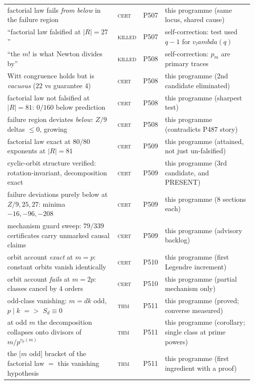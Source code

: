 \documentclass[12pt,a4paper]{article}
\def\mathbb#1{#1}%
\def\textbf#1{#1}%
\def\lambda{lambda}%
\def\Rightarrow{ => }%
\theoremstyle{definition}
\newcommand{\ZZ}{\mathbb{Z}}
\begin{document}
\begin{center}
\begin{tabular}{@{}p{}llp{}@{}}
factorial law fails \emph{from below} in the failure region & \textsc{cert} & P507 & this programme (same locus, shared cause) \\
``factorial law falsified at $|R|{=}27$'' & \textsc{killed} & P507 & self-correction: test used $q{-}1$ for $v_\lambda(q)$ \\
``the $m!$ is what Newton divides by'' & \textsc{killed} & P508 & self-correction: $p_m$ are primary traces \\
Witt congruence holds but is \emph{vacuous} ($22$ vs guarantee $4$) & \textsc{cert} & P508 & this programme (2nd candidate eliminated) \\
factorial law not falsified at $|R|{=}81$: $0/160$ below prediction & \textsc{cert} & P508 & this programme (sharpest test) \\
failure region deviates \emph{below}: $\ZZ/9$ deltas $\le0$, growing & \textsc{cert} & P508 & this programme (contradicts P487 story) \\
factorial law \textbf{exact at $80/80$} exponents at $|R|{=}81$ & \textsc{cert} & P509 & this programme (attained, not just un-falsified) \\
cyclic-orbit structure verified: rotation-invariant, decomposition exact & \textsc{cert} & P509 & this programme (3rd candidate, and PRESENT) \\
failure deviations purely below at $\ZZ/9,25,27$: minima $-16,-96,-208$ & \textsc{cert} & P509 & this programme (8 sections each) \\
mechanism guard sweep: $79/339$ certificates carry unmarked causal claims & \textsc{cert} & P509 & this programme (advisory backlog) \\
orbit account \emph{exact} at $m{=}p$: constant orbits vanish identically & \textsc{cert} & P510 & this programme (first Legendre increment) \\
orbit account \emph{fails} at $m{=}2p$: classes cancel by $4$ orders & \textsc{cert} & P510 & this programme (partial mechanism only) \\
odd-class vanishing: $m{=}dk$ odd, $p\mid k$ $\Rightarrow$ $S_d\equiv0$ & \textsc{thm} & P511 & this programme (proved; converse measured) \\
at odd $m$ the decomposition collapses onto divisors of $m/p^{v_p(m)}$ & \textsc{thm} & P511 & this programme (corollary; single class at prime powers) \\
the $[m$ odd$]$ bracket of the factorial law $=$ this vanishing hypothesis & \textsc{thm} & P511 & this programme (first ingredient with a proof) \\

\end{tabular}
\end{center}
\end{document}
